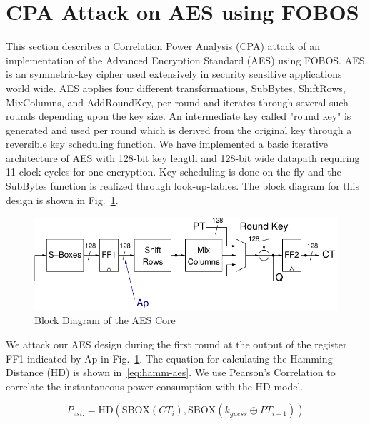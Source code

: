 \section{CPA Attack on AES using FOBOS}

This section describes a Correlation Power Analysis (CPA) attack of an implementation of the
Advanced Encryption Standard (AES) using FOBOS. 
AES is an symmetric-key cipher used extensively
in security sensitive applications world wide. AES applies four different transformations,
SubBytes, ShiftRows, MixColumns, and AddRoundKey, per round and iterates through several 
such rounds depending upon the key size. An intermediate key called 
"round key" is generated and used per round which is derived from the original key through 
a reversible key scheduling function. We have implemented a basic iterative architecture 
of AES with 128-bit 
key length and 128-bit wide datapath requiring 11 clock cycles for one encryption.
Key scheduling is done on-the-fly and the SubBytes function is realized through look-up-tables.
The block diagram for this design is shown in Fig.~\ref{fig:fobos-aes128}.

\begin{figure}[ht]
\begin{center}
\includegraphics[scale=0.8]{figures/aes128}
\caption{Block Diagram of the AES Core}\label{fig:fobos-aes128}
\end{center} 
\vspace{-3ex}
\end{figure}

We attack our AES design during the first round at the output of the register \textsf{FF1} 
indicated by \textsf{Ap} in Fig.~\ref{fig:fobos-aes128}.
The equation for calculating the Hamming Distance (HD) is shown 
in~\ref{eq:hamm-aes}. We use Pearson's Correlation to correlate the instantaneous
power consumption with the HD model. 

\begin{equation}\label{eq:hamm-aes}%
P_{est.} = \mathrm{HD}(\mathrm{SBOX}(CT_{i}), \mathrm{SBOX}(k_{guess} \oplus PT_{i+1}))
\end{equation}



